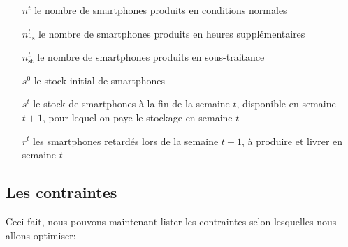 \begin{itemize}[before={\renewcommand\makelabel[1]{\makebox[1cm][r]{##1\hspace{.2cm}}}}]
    \item[$n^t$] le nombre de smartphones produits en conditions normales
    \item[$n_\mathrm{hs}^t$] le nombre de smartphones produits en heures supplémentaires
    \item[$n_\mathrm{st}^t$] le nombre de smartphones produits en sous-traitance
    \item[$s^0$] le stock initial de smartphones
    \item[$s^t$] le stock de smartphones à la fin de la semaine $t$, disponible en semaine $t+1$, pour lequel on paye le stockage en semaine $t$
    \item[$r^t$] les smartphones retardés lors de la semaine $t-1$, à produire et livrer en semaine $t$
\end{itemize}

\subsection*{Les contraintes}

Ceci fait, nous pouvons maintenant lister les contraintes selon lesquelles nous allons optimiser:


